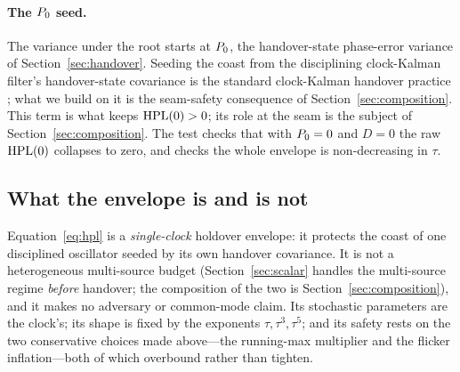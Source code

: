 \paragraph{The $P_0$ seed.}
The variance under the root starts at $P_0$, the handover-state phase-error
variance of Section~\ref{sec:handover}. Seeding the coast from the disciplining
clock-Kalman filter's handover-state covariance is the standard clock-Kalman
handover practice \citep{galleani2010}; what we build on it is the seam-safety
consequence of Section~\ref{sec:composition}. This term is what keeps $\mathrm{HPL}(0)>0$;
its role at the seam is the subject of Section~\ref{sec:composition}. The test
 checks that with $P_0=0$ and $D=0$
the raw $\mathrm{HPL}(0)$ collapses to zero, and 
checks the whole envelope is non-decreasing in $\tau$.

\subsection{What the envelope is and is not}
\label{sec:hplscope}

Equation~\eqref{eq:hpl} is a \emph{single-clock} holdover envelope: it protects the
coast of one disciplined oscillator seeded by its own handover covariance. It is
not a heterogeneous multi-source budget (Section~\ref{sec:scalar} handles the
multi-source regime \emph{before} handover; the composition of the two is
Section~\ref{sec:composition}), and it makes no adversary or common-mode claim.
Its stochastic parameters are the clock's; its shape is fixed by the exponents
$\tau,\tau^{3},\tau^{5}$; and its safety rests on the two conservative choices made
above---the running-max multiplier and the flicker inflation---both of which
overbound rather than tighten.
